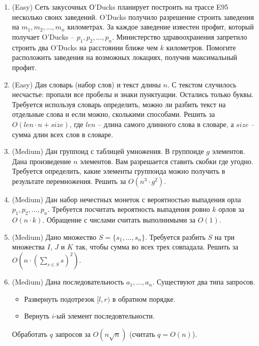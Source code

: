 \section{}

\begin{enumerate}

  \item (Easy) Сеть закусочных О'Ducks планирует построить на трассе
  E95 несколько своих заведений. O'Ducks получило разрешение
  строить заведения на $m_1, m_2, \dots, m_n$ километрах.
  За каждое заведение известен профит, который получает O'Ducks -- 
  $p_1, p_2, \dots, p_n$. Министерство здравоохранения запретило
  строить два O'Ducks на расстоянии ближе чем $k$ километров.
  Помогите расположить заведения на возможных локациях, получив
  максимальный профит.

  \item (Easy) Дан словарь (набор слов) и текст длины $n$. С текстом случилось
  несчастье: пропали все пробелы и знаки пунктуации. Остались
  только буквы. Требуется используя словарь определить, можно
  ли разбить текст на отдельные слова и если можно, сколькими
  способами. Решить за $O(len \cdot n + size)$, где $len$ -- длина
  самого длинного слова в словаре, а $size$ -- сумма длин всех слов
  в словаре.

  \item (Medium) Дан группоид с таблицей умножения. В группоиде $g$ элементов.
  Дана произведение $n$ элементов. Вам разрешается ставить скобки
  где угодно. Требуется определить, какие элементы группоида можно
  получить в результате перемножения. Решить за $O(n^3 \cdot g^2)$.

  \item (Medium) Дан набор нечестных монеток с вероятностью выпадения орла
  $p_1, p_2, \dots, p_n$. Требуется посчитать вероятность выпадения
  ровно $k$ орлов за $O(n \cdot k)$. Обращение с числами считать 
  выполнимыми за $O(1)$.
  

  \item (Medium) Дано множество $S = \{s_1, \dots, s_n\}$. Требуется
  разбить $S$ на три множества $I$, $J$ и $K$ так, чтобы
  сумма во всех трех совпадала. Решить за $O(n \cdot (\sum_{s \in S} s)^2)$.

  \item (Medium) Дана последовательность $a_1, \dots, a_n$. Существуют
  два типа запросов.
  \begin{itemize}
    \item Развернуть подотрезок $[l, r)$ в обратном порядке.
    \item Вернуть $i$-ый элемент последовтельности.
  \end{itemize}
  Обработать $q$ запросов за $O(n \sqrt{n})$ (считать $q = O(n)$).


\end{enumerate}
